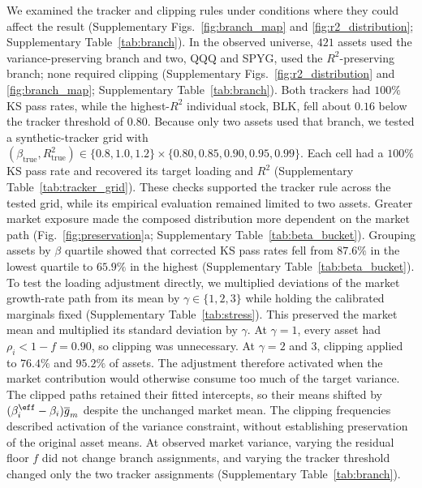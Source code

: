 We examined the tracker and clipping rules under conditions where
they could affect the result (Supplementary Figs.~\ref{fig:branch_map} and
\ref{fig:r2_distribution}; Supplementary Table~\ref{tab:branch}). In the observed universe, $421$ assets
used the variance-preserving branch and two, QQQ and SPYG, used the
$R^2$-preserving branch; none required clipping
(Supplementary Figs.~\ref{fig:r2_distribution} and \ref{fig:branch_map};
Supplementary Table~\ref{tab:branch}). Both trackers had $100\%$ KS pass rates,
while the highest-$R^2$ individual stock, BLK, fell about $0.16$
below the tracker threshold of $0.80$. Because only two assets used
that branch, we tested a synthetic-tracker grid with
$(\beta_{\mathrm{true}},R^2_{\mathrm{true}})\in\{0.8,1.0,1.2\}
\times\{0.80,0.85,0.90,0.95,0.99\}$. Each cell had a $100\%$ KS pass
rate and recovered its target loading and $R^2$
(Supplementary Table~\ref{tab:tracker_grid}). These checks supported the tracker
rule across the tested grid, while its empirical evaluation remained
limited to two assets.
Greater market exposure made the composed distribution more dependent
on the market path (Fig.~\ref{fig:preservation}a;
Supplementary Table~\ref{tab:beta_bucket}). Grouping assets by $\beta$ quartile showed that
corrected KS pass rates fell from $87.6\%$ in the lowest quartile
to $65.9\%$ in the highest (Supplementary Table~\ref{tab:beta_bucket}).
To test the loading adjustment directly, we multiplied deviations of
the market growth-rate path from its mean by
$\gamma\in\{1,2,3\}$ while holding the calibrated marginals fixed
(Supplementary Table~\ref{tab:stress}). This preserved the market mean and multiplied
its standard deviation by $\gamma$. At $\gamma=1$, every
asset had $\rho_i<1-f=0.90$, so clipping was unnecessary.
At $\gamma=2$ and $3$, clipping applied to $76.4\%$ and $95.2\%$
of assets. The adjustment therefore activated when the market
contribution would otherwise consume too much of the target variance.
The clipped paths retained their fitted intercepts, so their means
shifted by $(\beta_i^{\eff}-\beta_i)\overline{g}_m$ despite the
unchanged market mean. The clipping frequencies described activation
of the variance constraint, without establishing preservation of the
original asset means. At observed market variance, varying the residual floor
$f$ did not change branch assignments, and varying the tracker
threshold changed only the two tracker assignments
(Supplementary Table~\ref{tab:branch}).
